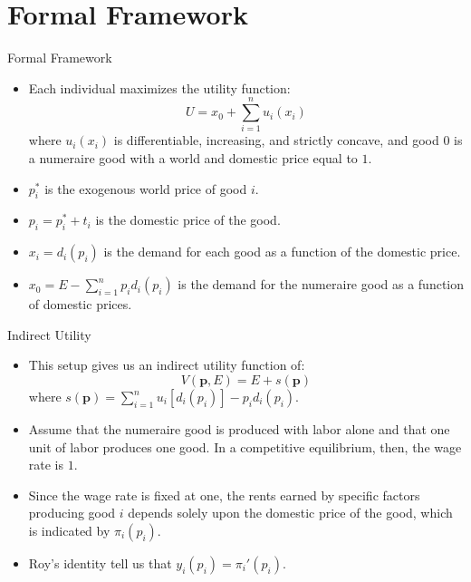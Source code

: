 \documentclass[aspectratio=169]{beamer}
\begin{document}

\section{Formal Framework}


\begin{frame}{Formal Framework}

\begin{itemize}
    \item<1-> Each individual maximizes the utility function:
    \begin{equation*}
        U = x_{0} + \sum_{i = 1}^{n} u_{i}\left( x_{i} \right)
    \end{equation*}
    where $ u_{i}\left( x_{i} \right) $ is differentiable, increasing, and strictly concave, and good $ 0 $ is a numeraire good with a world and domestic price equal to $ 1 $.
    \item<2-> $ p_{i}^{*} $ is the exogenous world price of good $ i $.
    \item<3-> $ p_{i} = p_{i}^{*} + t_{i} $ is the domestic price of the good.
    \item<4-> $ x_{i} = d_{i}\left( p_{i} \right) $ is the demand for each good as a function of the domestic price.
    \item<5-> $ x_{0} = E - \sum_{i = 1}^{n} p_{i} d_{i}\left( p_{i} \right) $ is the demand for the numeraire good as a function of domestic prices.
\end{itemize}
    
\end{frame}


\begin{frame}{Indirect Utility}

\begin{itemize}
    \item<1-> This setup gives us an indirect utility function of:
    \begin{equation*}
        V\left( \mathbf{p}, E \right) = E + s\left( \mathbf{p} \right)
    \end{equation*}
    where $ s\left( \mathbf{p} \right) = \sum_{i = 1}^{n} u_{i}\left[ d_{i}\left( p_{i} \right) \right] - p_{i} d_{i}\left( p_{i} \right) $.
    \item<2-> Assume that the numeraire good is produced with labor alone and that one unit of labor produces one good.  In a competitive equilibrium, then, the wage rate is $ 1 $.
    \item<3-> Since the wage rate is fixed at one, the rents earned by specific factors producing good $ i $ depends solely upon the domestic price of the good, which is indicated by $ \pi_{i}\left( p_{i} \right) $.
    \item<4-> Roy’s identity tell us that $ y_{i}\left( p_{i} \right) = \pi_{i}'\left( p_{i} \right) $.
\end{itemize}
    
\end{frame}
\end{document}
